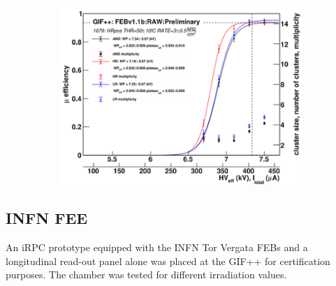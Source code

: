 \begin{figure}[H]
\begin{subfigure}{.5\linewidth}
			\includegraphics[width = \linewidth]{fig/chapt6/iRPC-RPCROC-GIFpp-SourceON-3kHz.png}
			\caption{\label{fig:RPCROCv1_Res:C}}
		\end{subfigure}
		\caption{\label{fig:RPCROCv1_Res} }
    \end{figure}
	
		\subsection{INFN FEE}
		\label{chapt6:ssec:INFNcert}
		
	An iRPC prototype equipped with the INFN Tor Vergata FEBs and a longitudinal read-out panel alone was placed at the GIF++ for certification purposes. The chamber was tested for different irradiation values.
	 
